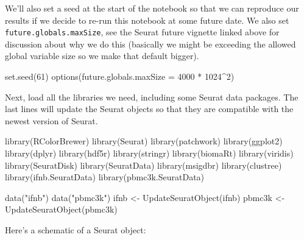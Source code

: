 \documentclass[
  letterpaper,
  DIV=11,
  numbers=noendperiod]{scrreprt}
\newenvironment{Shaded}{\begin{snugshade}}{\end{snugshade}}
\newcommand{\AttributeTok}[1]{\textcolor[rgb]{0.40,0.45,0.13}{#1}}
\newcommand{\DecValTok}[1]{\textcolor[rgb]{0.68,0.00,0.00}{#1}}
\newcommand{\FunctionTok}[1]{\textcolor[rgb]{0.28,0.35,0.67}{#1}}
\newcommand{\NormalTok}[1]{\textcolor[rgb]{0.00,0.23,0.31}{#1}}
\newcommand{\OtherTok}[1]{\textcolor[rgb]{0.00,0.23,0.31}{#1}}
\newcommand{\SpecialCharTok}[1]{\textcolor[rgb]{0.37,0.37,0.37}{#1}}
\newcommand{\StringTok}[1]{\textcolor[rgb]{0.13,0.47,0.30}{#1}}
\begin{document}
We'll also set a seed at the start of the notebook so that we can
reproduce our results if we decide to re-run this notebook at some
future date. We also set \texttt{future.globals.maxSize}, see the Seurat
future vignette linked above for discussion about why we do this
(basically we might be exceeding the allowed global variable size so we
make that default bigger).

\begin{Shaded}
\begin{Highlighting}[]
\FunctionTok{set.seed}\NormalTok{(}\DecValTok{61}\NormalTok{)}
\FunctionTok{options}\NormalTok{(}\AttributeTok{future.globals.maxSize =} \DecValTok{4000} \SpecialCharTok{*} \DecValTok{1024}\SpecialCharTok{\^{}}\DecValTok{2}\NormalTok{)}
\end{Highlighting}
\end{Shaded}

Next, load all the libraries we need, including some Seurat data
packages. The last lines will update the Seurat objects so that they are
compatible with the newest version of Seurat.

\begin{Shaded}
\begin{Highlighting}[]
\FunctionTok{library}\NormalTok{(RColorBrewer)}
\FunctionTok{library}\NormalTok{(Seurat)}
\FunctionTok{library}\NormalTok{(patchwork)}
\FunctionTok{library}\NormalTok{(ggplot2)}
\FunctionTok{library}\NormalTok{(dplyr)}
\FunctionTok{library}\NormalTok{(hdf5r)}
\FunctionTok{library}\NormalTok{(stringr)}
\FunctionTok{library}\NormalTok{(biomaRt)}
\FunctionTok{library}\NormalTok{(viridis)}
\FunctionTok{library}\NormalTok{(SeuratDisk)}
\FunctionTok{library}\NormalTok{(SeuratData)}
\FunctionTok{library}\NormalTok{(msigdbr)}
\FunctionTok{library}\NormalTok{(clustree)}
\FunctionTok{library}\NormalTok{(}\StringTok{\textquotesingle{}ifnb.SeuratData\textquotesingle{}}\NormalTok{)}
\FunctionTok{library}\NormalTok{(}\StringTok{\textquotesingle{}pbmc3k.SeuratData\textquotesingle{}}\NormalTok{)}

\FunctionTok{data}\NormalTok{(}\StringTok{"ifnb"}\NormalTok{)}
\FunctionTok{data}\NormalTok{(}\StringTok{"pbmc3k"}\NormalTok{)}
\NormalTok{ifnb }\OtherTok{\textless{}{-}} \FunctionTok{UpdateSeuratObject}\NormalTok{(ifnb)}
\NormalTok{pbmc3k }\OtherTok{\textless{}{-}} \FunctionTok{UpdateSeuratObject}\NormalTok{(pbmc3k)}
\end{Highlighting}
\end{Shaded}

Here's a schematic of a Seurat object:
\end{document}
